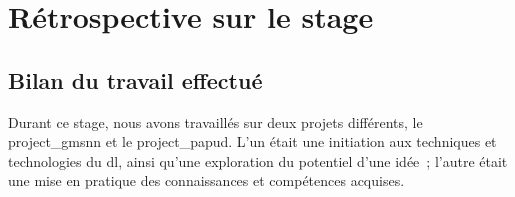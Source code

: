 






\chapter{Rétrospective sur le stage}
\section{Bilan du travail effectué}
Durant ce stage, nous avons travaillés sur deux projets différents, le \gls{project_gmsnn} et le \gls{project_papud}.
L'un était une initiation aux techniques et technologies du \gls{dl}, ainsi qu'une exploration du potentiel d'une idée~; l'autre était une mise en pratique des connaissances et compétences acquises.

